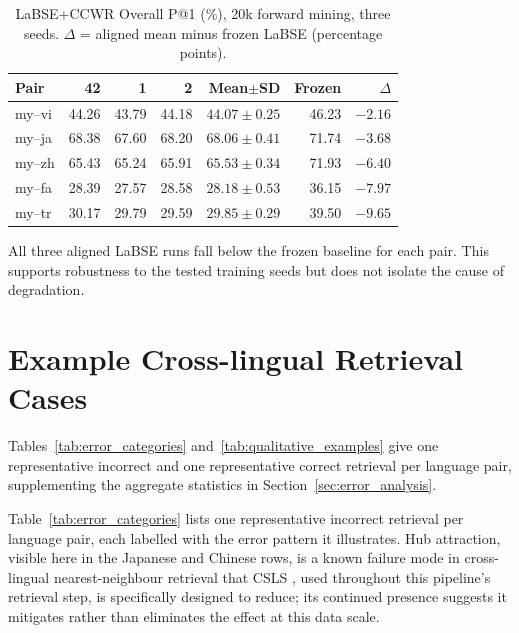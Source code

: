\documentclass[11pt]{article}
\begin{document}
\begin{table}[t]
\centering
\scriptsize
\setlength{\tabcolsep}{3pt}
\caption{LaBSE+CCWR Overall P@1 (\%), 20k forward mining, three seeds. $\Delta$ = aligned mean minus frozen LaBSE (percentage points).}
\label{tab:labse_seed_runs}
\begin{tabular}{lrrrrrr}
\toprule
\textbf{Pair} & \textbf{42} & \textbf{1} & \textbf{2} & \textbf{Mean$\pm$SD} & \textbf{Frozen} & \textbf{$\Delta$} \\
\midrule
my--vi & 44.26 & 43.79 & 44.18 & $44.07\pm0.25$ & 46.23 & $-2.16$ \\
my--ja & 68.38 & 67.60 & 68.20 & $68.06\pm0.41$ & 71.74 & $-3.68$ \\
my--zh & 65.43 & 65.24 & 65.91 & $65.53\pm0.34$ & 71.93 & $-6.40$ \\
my--fa & 28.39 & 27.57 & 28.58 & $28.18\pm0.53$ & 36.15 & $-7.97$ \\
my--tr & 30.17 & 29.79 & 29.59 & $29.85\pm0.29$ & 39.50 & $-9.65$ \\
\bottomrule
\end{tabular}
\end{table}

All three aligned LaBSE runs fall below the frozen baseline for each pair. This supports robustness to the tested training seeds but does not isolate the cause of degradation.

\section{Example Cross-lingual Retrieval Cases}
\label{app:examples}

Tables~\ref{tab:error_categories} and~\ref{tab:qualitative_examples} give one representative incorrect and one representative correct retrieval per language pair, supplementing the aggregate statistics in Section~\ref{sec:error_analysis}.

Table~\ref{tab:error_categories} lists one representative incorrect retrieval per language pair, each labelled with the error pattern it illustrates. Hub attraction, visible here in the Japanese and Chinese rows, is a known failure mode in cross-lingual nearest-neighbour retrieval that CSLS \citep{conneau2018word}, used throughout this pipeline's retrieval step, is specifically designed to reduce; its continued presence suggests it mitigates rather than eliminates the effect at this data scale.
\end{document}
